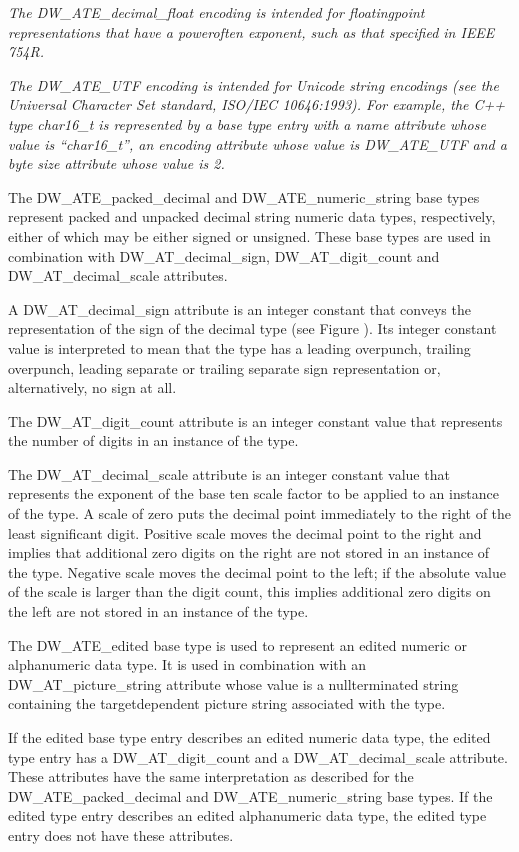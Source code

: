 \textit{The DW\_ATE\_decimal\_float encoding is intended for
floating\dash point representations that have a power\dash of\dash ten
exponent, such as that specified in IEEE 754R.}

\textit{The DW\_ATE\_UTF encoding is intended for Unicode string
encodings (see the Universal Character Set standard,
ISO/IEC 10646:1993). For example, the C++ type char16\_t is
represented by a base type entry with a name attribute whose
value is “char16\_t”, an encoding attribute whose value
is DW\_ATE\_UTF and a byte size attribute whose value is 2.}

The DW\_ATE\_packed\_decimal and DW\_ATE\_numeric\_string base types
represent packed and unpacked decimal string numeric data
types, respectively, either of which may be either signed
or unsigned. These base types are used in combination with
DW\_AT\_decimal\_sign, DW\_AT\_digit\_count and DW\_AT\_decimal\_scale
attributes.

A DW\_AT\_decimal\_sign attribute is an integer constant that
conveys the representation of the sign of the decimal type
(see Figure ). 
Its integer constant value is interpreted to
mean that the type has a leading overpunch, trailing overpunch,
leading separate or trailing separate sign representation or,
alternatively, no sign at all.

The DW\_AT\_digit\_count attribute is an integer constant
value that represents the number of digits in an instance of
the type.

The DW\_AT\_decimal\_scale attribute is an integer constant value
that represents the exponent of the base ten scale factor to
be applied to an instance of the type. A scale of zero puts the
decimal point immediately to the right of the least significant
digit. Positive scale moves the decimal point to the right
and implies that additional zero digits on the right are not
stored in an instance of the type. Negative scale moves the
decimal point to the left; if the absolute value of the scale
is larger than the digit count, this implies additional zero
digits on the left are not stored in an instance of the type.

The DW\_ATE\_edited base type is used to represent an edited
numeric or alphanumeric data type. It is used in combination
with an DW\_AT\_picture\_string attribute whose value is a 
null\dash terminated string containing the target\dash dependent picture
string associated with the type.

If the edited base type entry describes an edited numeric
data type, the edited type entry has a DW\_AT\_digit\_count and a
DW\_AT\_decimal\_scale attribute. These attributes have the same
interpretation as described for the DW\_ATE\_packed\_decimal and
DW\_ATE\_numeric\_string base types. If the edited type entry
describes an edited alphanumeric data type, the edited type
entry does not have these attributes.


